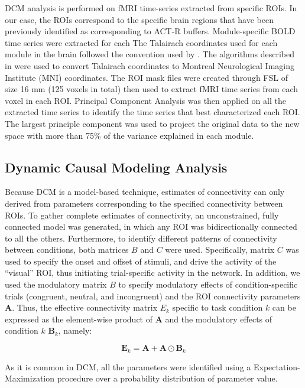\documentclass[10pt,letterpaper]{article}
\newcommand{\mat}[1]{\boldsymbol{#1}} %
\begin{document}
DCM analysis is performed on fMRI time-series extracted from specific ROIs. In our case, the ROIs correspond to the specific brain regions that have been previously identified as corresponding to ACT-R buffers. Module-specific BOLD time series were extracted for each  The Talairach coordinates used for each module in the brain followed the convention used by \cite{Anderson2008, Borst2017}. The algorithms described in \cite{Lacadie2008} were used to convert Talairach coordinates to Montreal Neurological Imaging Institute (MNI) coordinates. The ROI mask files were created through FSL \cite{Woolrich2009} of size 16 mm (125 voxels in total) then used to extract fMRI time series from each voxel in each ROI. Principal Component Analysis was then applied on all the extracted time series to identify the time series that best characterized each ROI. The largest principle component was used to project the original data to the new space with more than 75\% of the variance explained in each module. 

\subsection{Dynamic Causal Modeling Analysis}

Because DCM is a model-based technique, estimates of connectivity can only derived from parameters corresponding to the specified connectivity between ROIs.  To gather complete estimates of connectivity, an unconstrained, fully connected model was generated, in which any ROI was bidirectionally connected to all the others. Furthermore, to identify different patterns of connectivity between conditions, both matrices $B$ and $C$ were used. Specifically, matrix $C$ was used to specify the onset and offset of stimuli, and drive the activity  of the ``visual'' ROI, thus initiating trial-specific activity in the network. In addition, we used the modulatory matrix $B$ to specify modulatory effects of condition-specific trials (congruent, neutral, and incongruent) and the ROI connectivity parameters $\mat{A}$. Thus, the effective connectivity matrix $E_k$ specific to task condition $k$ can be expressed as the element-wise product of $\mat{A}$ and the modulatory effects of condition $k$ $\mat{B}_k$, namely:

\begin{equation}
\mat{E}_k = \mat{A} + \mat{A} \odot \mat{B}_k
\label{dcm:trick}
\end{equation}

As it is common in DCM, all the parameters were identified using a Expectation-Maximization procedure over a probability distribution of parameter value. 
\end{document}
